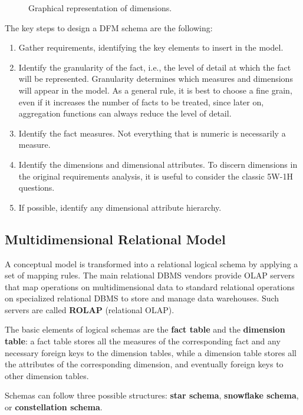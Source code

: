 \begin{figure}[H]
    \centering
    
    \caption{Graphical representation of dimensions.}
\end{figure}
The key steps to design a DFM schema are the following:
\begin{enumerate}[noitemsep]
    \item Gather requirements, identifying the key elements to insert in the model.
    \item Identify the granularity of the fact, i.e., the level of detail at which the fact will be represented. Granularity determines which measures and dimensions will appear in the model. As a general rule, it is best to choose a fine grain, even if it increases the number of facts to be treated, since later on, aggregation functions can always reduce the level of detail.
    \item Identify the fact measures. Not everything that is numeric is necessarily a measure.
    \item Identify the dimensions and dimensional attributes. To discern dimensions in the original requirements analysis, it is useful to consider the classic 5W-1H questions.
    \item If possible, identify any dimensional attribute hierarchy.
\end{enumerate}

\subsection{Multidimensional Relational Model}

A conceptual model is transformed into a relational logical schema by applying a set of mapping rules. The main relational DBMS vendors provide OLAP servers that map operations on multidimensional data to standard relational operations on specialized relational DBMS to store and manage data warehouses. Such servers are called \textbf{ROLAP} (relational OLAP).

The basic elements of logical schemas are the \textbf{fact table} and the \textbf{dimension table}: a fact table stores all the measures of the corresponding fact and any necessary foreign keys to the dimension tables, while a dimension table stores all the attributes of the corresponding dimension, and eventually foreign keys to other dimension tables.

Schemas can follow three possible structures: \textbf{star schema}, \textbf{snowflake schema}, or \textbf{constellation schema}. 

